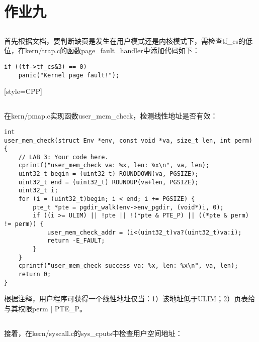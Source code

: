 \section{作业九}
    \subsection{}
        首先根据文档，要判断缺页是发生在用户模式还是内核模式下，需检查tf_cs的低位，在kern/trap.c的函数page_fault_handler中添加代码如下：

        \begin{lstlisting}[style=CPP]
if ((tf->tf_cs&3) == 0)
    panic("Kernel page fault!");
        \end{lstlisting}[style=CPP]

    \subsection{}
        在kern/pmap.c实现函数user_mem_check，检测线性地址是否有效：

        \begin{lstlisting}[style=CPP]
int
user_mem_check(struct Env *env, const void *va, size_t len, int perm)
{
    // LAB 3: Your code here.
    cprintf("user_mem_check va: %x, len: %x\n", va, len);
    uint32_t begin = (uint32_t) ROUNDDOWN(va, PGSIZE); 
    uint32_t end = (uint32_t) ROUNDUP(va+len, PGSIZE);
    uint32_t i;
    for (i = (uint32_t)begin; i < end; i += PGSIZE) {
        pte_t *pte = pgdir_walk(env->env_pgdir, (void*)i, 0);
        if ((i >= ULIM) || !pte || !(*pte & PTE_P) || ((*pte & perm) != perm)) {
            user_mem_check_addr = (i<(uint32_t)va?(uint32_t)va:i);
            return -E_FAULT;
        }
    }
    cprintf("user_mem_check success va: %x, len: %x\n", va, len);
    return 0;
}
        \end{lstlisting}

        根据注释，用户程序可获得一个线性地址仅当：1）该地址低于ULIM；2）页表给与其权限perm | PTE_P。

    \subsection{}
        接着，在kern/syscall.c的sys_cputs中检查用户空间地址：

